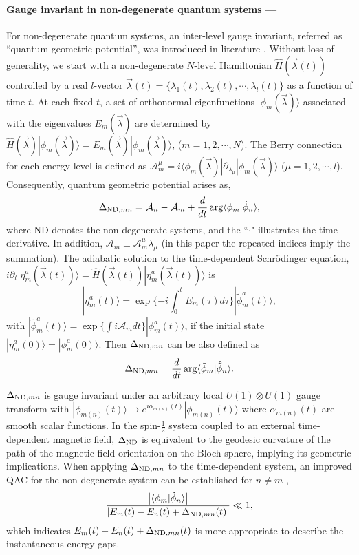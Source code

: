 \documentclass[aps,pra,twocolumn,groupedaddress,10pt]{revtex4}
\def\be{\begin{equation}} \def\ee{\end{equation}}
\begin{document}
\paragraph*{Gauge invariant in non-degenerate quantum systems ---}
For non-degenerate quantum systems, an inter-level gauge
invariant, referred as
``quantum geometric potential'',
was introduced in literature \cite{PhysRevA.77.062114}.
Without loss of generality, we start with a non-degenerate $N$-level
Hamiltonian $\hat{H}(\vec{\lambda}(t))$ controlled by a real $l$-vector
$\vec{\lambda}(t) = \{\lambda_1(t), \lambda_2(t),\cdots,\lambda_l(t) \}$
as a function of time $t$.
At each fixed $t$, a set of orthonormal eigenfunctions
$|\phi_m(\vec{\lambda})\rangle$ associated with the
eigenvalues $E_m(\vec{\lambda})$ are determined by
$\hat{H}(\vec{\lambda})|\phi_m(\vec{\lambda})\rangle =
E_m(\vec{\lambda})|\phi_m(\vec{\lambda})\rangle$, ($m=1,2,\cdots,N$).
The Berry connection for each energy level is defined as
$\mathcal{A}_{m}^{\mu}=i\langle\phi_m(\vec{\lambda})
|\partial_{\lambda_\mu}|\phi_m(\vec{\lambda})\rangle$ ($\mu = 1, 2, \cdots, l$).
Consequently, quantum geometric potential arises as,
\be
\Delta_{{\rm{ND}},mn} = \mathcal{A}_{n} - \mathcal{A}_{m} + \frac{d}{dt}\arg \langle\phi_m|\dot{\phi}_n\rangle,
\label{eq:ndqgp}
\ee
where ND denotes the non-degenerate systems, and the ``$\cdot$"
illustrates the time-derivative.
In addition, $\mathcal{A}_{m} \equiv \mathcal{A}_{m}^{\mu} \dot{\lambda}_{\mu} $
(in this paper the repeated indices imply the summation).
The adiabatic solution to the time-dependent Schr\"odinger equation,
$i \partial_t |\eta_{m}^a(\vec{\lambda}(t))\rangle
= \hat{H}(\vec{\lambda}(t))|\eta_{m}^a(\vec{\lambda}(t))\rangle$ is
\begin{equation}\label{eta}
|\eta_{m}^a(t)\rangle = \exp\{-i\int_0^t E_{m}(\tau)d\tau\}|\tilde{\phi}_{m}^a(t)\rangle,
\end{equation}
with
$|\tilde{\phi}_{m}^a(t)\rangle = \exp\{\int i\mathcal{A}_m dt \}|\phi_{m}^a(t)\rangle$,
if the initial state $|\eta_{m}^a(0)\rangle = |\phi_{m}^a(0)\rangle$.
Then $\Delta_{{\rm{ND}},mn}$ can be also defined as
\be\label{tild}
\Delta_{{\rm{ND}},mn} = \frac{d}{dt}\arg \langle\tilde{\phi}_m|\dot{\tilde{\phi}}_n\rangle.
\ee

$\Delta_{{\rm ND},mn} $ is gauge invariant under an arbitrary
local $U(1)\otimes U(1)$ gauge transform with
$|\phi_{m(n)}(t)\rangle\rightarrow e^{i\alpha_{m(n)}(t)}|\phi_{m(n)}(t)\rangle$
where $\alpha_{m(n)}(t)$ are smooth scalar functions.
In the spin-$\frac{1}{2}$ system coupled to an external time-dependent
magnetic field, $\Delta_{\rm{ND}}$ is equivalent to the
geodesic curvature of the path of the magnetic field orientation
on the Bloch sphere, implying its geometric implications.
When applying $\Delta_{{\rm{ND}},mn}$ to the time-dependent system,
an improved QAC for the non-degenerate system can be established
for $n\neq m$ \cite{PhysRevA.77.062114},
\be
\frac{{\left| {\langle\phi_m|\dot{\phi}_n\rangle } \right|}}
{{\left| {E_m (t) - E_n (t) + \Delta _{{\rm{ND}},mn} (t)} \right|}}
\ll 1 \label{eq:U1adia},
\ee
which indicates ${E_m (t) - E_n (t) + \Delta_{{\rm{ND}},mn} (t)} $
is more appropriate to describe the instantaneous energy gaps.
\end{document}
